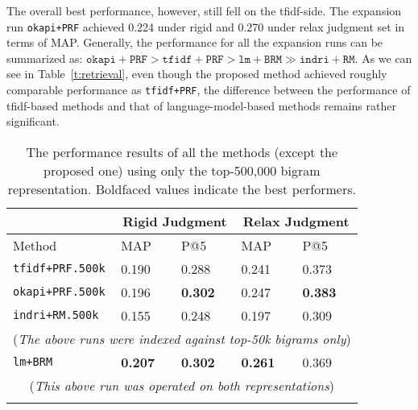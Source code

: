 The overall best performance, however, still fell on the tfidf-side.  The
expansion run {\tt okapi+PRF} achieved 0.224 under rigid and 0.270 under relax
judgment set in terms of MAP.  Generally, the performance for all the expansion
runs can be summarized as: $\mathtt{okapi+PRF} > \mathtt{tfidf+PRF} >
\mathtt{lm+BRM} \gg \mathtt{indri+RM}$.  As we can see in
Table~\ref{t:retrieval}, even though the proposed method achieved roughly
comparable performance as {\tt tfidf+PRF}, the difference between the
performance of tfidf-based methods and that of language-model-based methods
remains rather significant.  

\begin{table}[ht!]
  \centering
  \begin{tabular}{p{3cm}p{1.5cm}p{1.5cm}p{1.5cm}p{1.5cm}}
    & \multicolumn{2}{c}{Rigid Judgment} & \multicolumn{2}{c}{Relax Judgment} \\
    \hline
    Method & MAP & P@5 & MAP & P@5 \\
    \hline
    {\tt tfidf+PRF.500k} & 0.190 & 0.288 & 0.241 & 0.373 \\
    {\tt okapi+PRF.500k} & 0.196 & {\bf 0.302} & 0.247 & {\bf 0.383} \\
    {\tt indri+RM.500k} & 0.155 & 0.248 & 0.197 & 0.309 \\
    \multicolumn{5}{c}{({\it The above runs were indexed against top-50k bigrams only})} \\
    \hline
    {\tt lm+BRM} & {\bf 0.207} & {\bf 0.302} & {\bf 0.261} & 0.369 \\
    \multicolumn{5}{c}{({\it This above run was operated on both representations})} \\
    \\
  \end{tabular}
  \caption{The performance results of all the methods (except the proposed one)
  using only the top-500,000 bigram representation.  Boldfaced values indicate the
  best performers.} \label{t:retrieval.500k}
\end{table}

